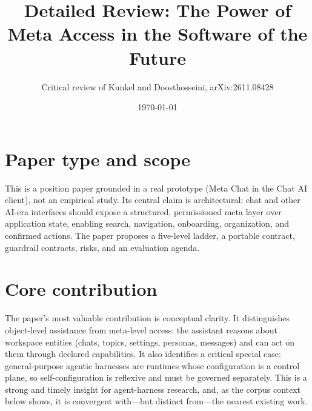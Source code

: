 \documentclass[11pt,a4paper]{article}
\title{Detailed Review: The Power of Meta Access in the Software of the Future}
\author{Critical review of Kunkel and Doosthosseini, arXiv:2611.08428}
\date{\today}
\begin{document}
\maketitle

\section{Paper type and scope}
This is a position paper grounded in a real prototype (Meta Chat in the Chat AI client), not an empirical study. Its central claim is architectural: chat and other AI-era interfaces should expose a structured, permissioned meta layer over application state, enabling search, navigation, onboarding, organization, and confirmed actions. The paper proposes a five-level ladder, a portable contract, guardrail contracts, risks, and an evaluation agenda.

\section{Core contribution}
The paper's most valuable contribution is conceptual clarity. It distinguishes object-level assistance from meta-level access: the assistant reasons about workspace entities (chats, topics, settings, personas, messages) and can act on them through declared capabilities. It also identifies a critical special case: general-purpose agentic harnesses are runtimes whose configuration is a control plane, so self-configuration is reflexive and must be governed separately. This is a strong and timely insight for agent-harness research, and, as the corpus context below shows, it is convergent with---but distinct from---the nearest existing work.
\end{document}
